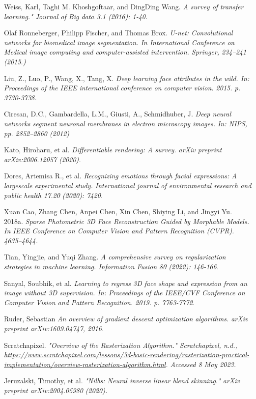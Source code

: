 \documentclass[12pt,a4]{article}
\begin{document}
\begin{thebibliography}{9}
    Weiss, Karl, Taghi M. Khoshgoftaar, and DingDing Wang.
    \textit{A survey of transfer learning." Journal of Big data 3.1 (2016): 1-40.}

    Olaf Ronneberger, Philipp Fischer, and Thomas Brox.
    \textit{U-net: Convolutional networks for biomedical image segmentation. In International Conference on Medical image computing and computer-assisted intervention. Springer, 234–241 (2015.)}

    Liu, Z., Luo, P., Wang, X., Tang, X.
    \textit{Deep learning face attributes in the wild. In: Proceedings of the IEEE international conference on computer vision. 2015. p. 3730-3738.}

    Ciresan, D.C., Gambardella, L.M., Giusti, A., Schmidhuber, J.
    \textit{Deep neural networks segment neuronal membranes in electron microscopy images. In: NIPS, pp. 2852–2860 (2012)}

    Kato, Hiroharu, et al.
    \textit{Differentiable rendering: A survey. arXiv preprint arXiv:2006.12057 (2020).}

    Dores, Artemisa R., et al.
    \textit{Recognizing emotions through facial expressions: A largescale experimental study. International journal of environmental research and public health 17.20 (2020): 7420.}

    Xuan Cao, Zhang Chen, Anpei Chen, Xin Chen, Shiying Li, and Jingyi Yu. 2018a.
    \textit{Sparse Photometric 3D Face Reconstruction Guided by Morphable Models. In    IEEE Conference on Computer Vision and Pattern Recognition (CVPR). 4635–4644.}

    Tian, Yingjie, and Yuqi Zhang.
    \textit{A comprehensive survey on regularization strategies in machine learning. Information Fusion 80 (2022): 146-166.}

    Sanyal, Soubhik, et al.
    \textit{Learning to regress 3D face shape and expression from an image without 3D supervision. In: Proceedings of the IEEE/CVF Conference on Computer Vision and Pattern Recognition. 2019. p. 7763-7772.}
    

    Ruder, Sebastian
    \textit{An overview of gradient descent optimization algorithms. arXiv preprint arXiv:1609.04747, 2016.}

    Scratchapixel.
    \textit{"Overview of the Rasterization Algorithm." Scratchapixel, n.d., \url{https://www.scratchapixel.com/lessons/3d-basic-rendering/rasterization-practical-implementation/overview-rasterization-algorithm.html}. Accessed 8 May 2023.}

    Jeruzalski, Timothy, et al.
    \textit{"Nilbs: Neural inverse linear blend skinning." arXiv preprint arXiv:2004.05980 (2020).}


	\end{thebibliography}
 
\end{document}
